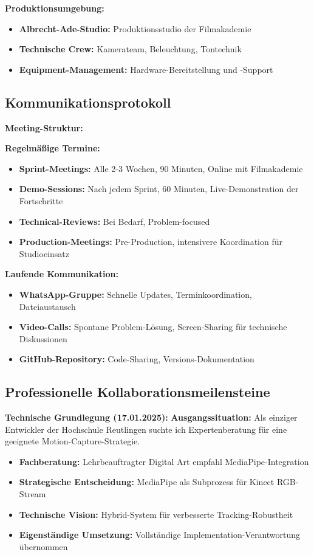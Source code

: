 \textbf{Produktionsumgebung:}
\begin{itemize}
    \item \textbf{Albrecht-Ade-Studio:} Produktionsstudio der Filmakademie
    \item \textbf{Technische Crew:} Kamerateam, Beleuchtung, Tontechnik
    \item \textbf{Equipment-Management:} Hardware-Bereitstellung und -Support
\end{itemize}

\subsection{Kommunikationsprotokoll}

\textbf{Meeting-Struktur:}

\textbf{Regelmäßige Termine:}
\begin{itemize}
    \item \textbf{Sprint-Meetings:} Alle 2-3 Wochen, 90 Minuten, Online mit Filmakademie
    \item \textbf{Demo-Sessions:} Nach jedem Sprint, 60 Minuten, Live-Demonstration der Fortschritte
    \item \textbf{Technical-Reviews:} Bei Bedarf, Problem-focused
    \item \textbf{Production-Meetings:} Pre-Production, intensivere Koordination für Studioeinsatz
\end{itemize}

\textbf{Laufende Kommunikation:}
\begin{itemize}
    \item \textbf{WhatsApp-Gruppe:} Schnelle Updates, Terminkoordination, Dateiaustausch
    \item \textbf{Video-Calls:} Spontane Problem-Lösung, Screen-Sharing für technische Diskussionen
    \item \textbf{GitHub-Repository:} Code-Sharing, Versions-Dokumentation
\end{itemize}

\subsection{Professionelle Kollaborationsmeilensteine}

\textbf{Technische Grundlegung (17.01.2025):}
\textbf{Ausgangssituation:} Als einziger Entwickler der Hochschule Reutlingen suchte ich Expertenberatung für eine geeignete Motion-Capture-Strategie.
\begin{itemize}
    \item \textbf{Fachberatung:} Lehrbeauftragter Digital Art empfahl MediaPipe-Integration
    \item \textbf{Strategische Entscheidung:} MediaPipe als Subprozess für Kinect RGB-Stream
    \item \textbf{Technische Vision:} Hybrid-System für verbesserte Tracking-Robustheit
    \item \textbf{Eigenständige Umsetzung:} Vollständige Implementation-Verantwortung übernommen
\end{itemize}

